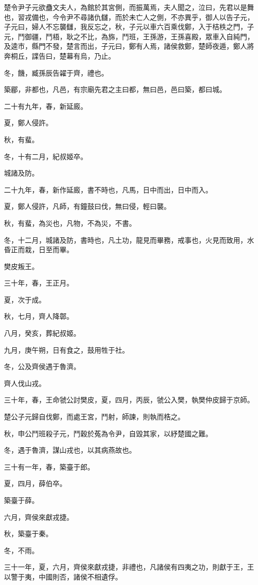 \begin{pinyinscope}
楚令尹子元欲蠱文夫人，為館於其宮側，而振萬焉，夫人聞之，泣曰，先君以是舞也，習戎備也，今令尹不尋諸仇讎，而於未亡人之側，不亦異乎，御人以告子元，子元曰，婦人不忘襲讎，我反忘之，秋，子元以車六百乘伐鄭，入于桔柣之門，子元，鬥御疆，鬥梧，耿之不比，為旆，鬥班，王孫游，王孫喜殿，眾車入自純門，及逵市，縣門不發，楚言而出，子元曰，鄭有人焉，諸侯救鄭，楚師夜遁，鄭人將奔桐丘，諜告曰，楚幕有烏，乃止。

冬，饑，臧孫辰告糴于齊，禮也。

築郿，非都也，凡邑，有宗廟先君之主曰都，無曰邑，邑曰築，都曰城。

二十有九年，春，新延廄。

夏，鄭人侵許。

秋，有蜚。

冬，十有二月，紀叔姬卒。

城諸及防。

二十九年，春，新作延廄，書不時也，凡馬，日中而出，日中而入。

夏，鄭人侵許，凡師，有鐘鼓曰伐，無曰侵，輕曰襲。

秋，有蜚，為災也，凡物，不為災，不書。

冬，十二月，城諸及防，書時也，凡土功，龍見而畢務，戒事也，火見而致用，水昏正而栽，日至而畢。

樊皮叛王。

三十年，春，王正月。

夏，次于成。

秋，七月，齊人降鄣。

八月，癸亥，葬紀叔姬。

九月，庚午朔，日有食之，鼓用牲于社。

冬，公及齊侯遇于魯濟。

齊人伐山戎。

三十年，春，王命虢公討樊皮，夏，四月，丙辰，虢公入樊，執樊仲皮歸于京師。

楚公子元歸自伐鄭，而處王宮，鬥射，師諫，則執而梏之。

秋，申公鬥班殺子元，鬥穀於菟為令尹，自毀其家，以紓楚國之難。

冬，遇于魯濟，謀山戎也，以其病燕故也。

三十有一年，春，築臺于郎。

夏，四月，薛伯卒。

築臺于薛。

六月，齊侯來獻戎捷。

秋，築臺于秦。

冬，不雨。

三十一年，夏，六月，齊侯來獻戎捷，非禮也，凡諸侯有四夷之功，則獻于王，王以警于夷，中國則否，諸侯不相遺俘。


\end{pinyinscope}
